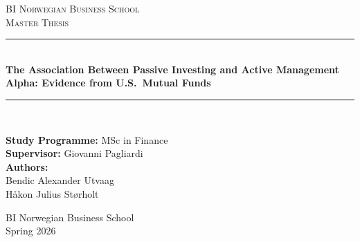 \documentclass[11pt, a4paper]{article}
\begin{document}
\begin{titlepage}
    \centering
    \vspace*{2cm}
    \textsc{\Large BI Norwegian Business School}\\[1.5cm]
    \textsc{\large Master Thesis}\\[0.5cm]

    \rule{\linewidth}{0.5mm} \\[0.4cm]
    {\huge \bfseries The Association Between Passive Investing and Active Management Alpha: Evidence from U.S.\ Mutual Funds} \\[0.4cm]
    \rule{\linewidth}{0.5mm} \\[1.5cm]

    \begin{minipage}{0.8\textwidth}
        \begin{flushleft} \large
            \textbf{Study Programme:} MSc in Finance \\
            \textbf{Supervisor:} Giovanni Pagliardi \\[0.5cm]
            \textbf{Authors:} \\
            Bendic Alexander Utvaag \\
            H\r{a}kon Julius St{\o}rholt \\
        \end{flushleft}
    \end{minipage}
    \vfill
    \begin{center}
        BI Norwegian Business School \\
        Spring 2026
    \end{center}
\end{titlepage}

\newpage
\end{document}
